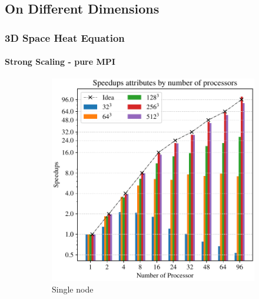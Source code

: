\subsection{On Different Dimensions}
\begin{frame}
  \frametitle{3D Space Heat Equation}
  \framesubtitle{Strong Scaling - pure MPI}
  
  \begin{figure}
    \centering
    \begin{subfigure}{0.42\textwidth}
      \centering
      \includegraphics[width=\textwidth]{figure/FIG_Benchmark_pure_mpi_3D.pdf}
      \caption{Single node}
      \label{FIG:Benchmark:Pure_MPI_Single_Node_3D}
    \end{subfigure}
    \begin{subfigure}{0.42\textwidth}
      \centering

\end{subfigure}
\end{figure}
\end{frame}
